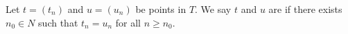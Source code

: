 Let $t = (t_n)$ and $u = (u_n)$ be points in $T$. We say $t$ and $u$ are  if there exists $n_0 \in N$ such that $t_n = u_n$ for all $n \geq n_0$.
